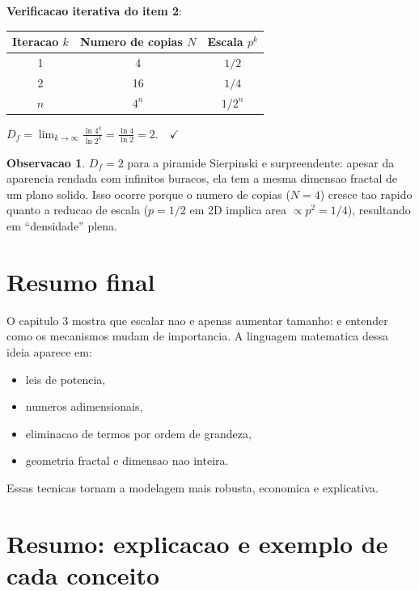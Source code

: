 \documentclass[12pt,a4paper,oneside]{book}
\theoremstyle{definition}
\newtheorem{remark}[definition]{Observacao}
\begin{document}
\textbf{Verificacao iterativa do item 2}:
\begin{center}
\begin{tabular}{ccc}
\toprule
Iteracao $k$ & Numero de copias $N$ & Escala $p^k$ \\
\midrule
1 & 4 & $1/2$ \\
2 & 16 & $1/4$ \\
$n$ & $4^n$ & $1/2^n$ \\
\bottomrule
\end{tabular}
\end{center}
$D_f = \displaystyle\lim_{k\to\infty}\frac{\ln 4^k}{\ln 2^k} = \frac{\ln 4}{\ln 2} = 2.\quad\checkmark$

\begin{remark}
$D_f = 2$ para a piramide Sierpinski e surpreendente: apesar da aparencia rendada
com infinitos buracos, ela tem a mesma dimensao fractal de um plano solido.
Isso ocorre porque o numero de copias ($N=4$) cresce tao rapido quanto a reducao de escala
($p=1/2$ em 2D implica area $\propto p^2 = 1/4$), resultando em ``densidade'' plena.
\end{remark}

\section{Resumo final}

O capitulo 3 mostra que escalar nao e apenas aumentar tamanho: e entender como os mecanismos mudam de importancia.
A linguagem matematica dessa ideia aparece em:
\begin{itemize}
    \item leis de potencia,
    \item numeros adimensionais,
    \item eliminacao de termos por ordem de grandeza,
    \item geometria fractal e dimensao nao inteira.
\end{itemize}

Essas tecnicas tornam a modelagem mais robusta, economica e explicativa.

\section{Resumo: explicacao e exemplo de cada conceito}
\end{document}
